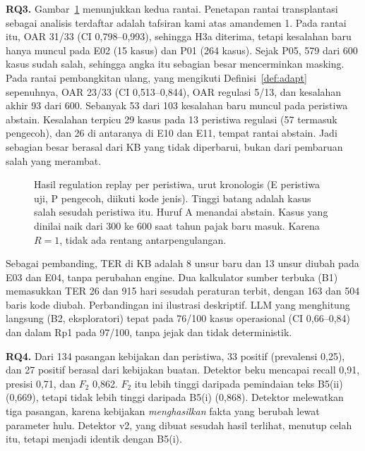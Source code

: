 \documentclass[conference]{IEEEtran}
\makeatletter
\DeclareRobustCommand{\en}[1]{{\usefont{\f@encoding}{\f@family}{\f@series}{it}#1\/}}
\makeatother
\begin{document}
\textbf{RQ3.} Gambar~\ref{fig:replay} menunjukkan kedua rantai. Penetapan rantai transplantasi sebagai analisis terdaftar adalah tafsiran kami atas amandemen 1. Pada rantai itu, OAR 31/33 (CI 0,798--0,993), sehingga H3a diterima, tetapi kesalahan baru hanya muncul pada E02 (15 kasus) dan P01 (264 kasus). Sejak P05, 579 dari 600 kasus sudah salah, sehingga angka itu sebagian besar mencerminkan \en{masking}. Pada rantai pembangkitan ulang, yang mengikuti Definisi~\ref{def:adapt} sepenuhnya, OAR 23/33 (CI 0,513--0,844), OAR regulasi 5/13, dan kesalahan akhir 93 dari 600. Sebanyak 53 dari 103 kesalahan baru muncul pada peristiwa \en{abstain}. Kesalahan terpicu 29 kasus pada 13 peristiwa regulasi (57 termasuk pengecoh), dan 26 di antaranya di E10 dan E11, tempat rantai \en{abstain}. Jadi sebagian besar berasal dari KB yang tidak diperbarui, bukan dari pembaruan salah yang merambat.

\begin{figure}[t]
\centering
\newcommand{\replaytinggi}{1.5cm}

\caption{Hasil \en{regulation replay} per peristiwa, urut kronologis (E peristiwa uji, P pengecoh, diikuti kode jenis). Tinggi batang adalah kasus salah sesudah peristiwa itu. Huruf A menandai \en{abstain}. Kasus yang dinilai naik dari 300 ke 600 saat tahun pajak baru masuk. Karena $R = 1$, tidak ada rentang antarpengulangan.}
\label{fig:replay}
\end{figure}

Sebagai pembanding, TER di KB adalah 8 unsur baru dan 13 unsur diubah pada E03 dan E04, tanpa perubahan \en{engine}. Dua kalkulator sumber terbuka (B1) memasukkan TER 26 dan 915 hari sesudah peraturan terbit, dengan 163 dan 504 baris kode diubah. Perbandingan ini ilustrasi deskriptif. LLM yang menghitung langsung (B2, eksploratori) tepat pada 76/100 kasus operasional (CI 0,66--0,84) dan dalam Rp1 pada 97/100, tanpa jejak dan tidak deterministik.

\textbf{RQ4.} Dari 134 pasangan kebijakan dan peristiwa, 33 positif (prevalensi 0,25), dan 27 positif berasal dari kebijakan buatan. Detektor beku mencapai \en{recall} 0,91, presisi 0,71, dan $F_2$ 0,862. $F_2$ itu lebih tinggi daripada pemindaian teks B5(ii) (0,669), tetapi tidak lebih tinggi daripada B5(i) (0,868). Detektor melewatkan tiga pasangan, karena kebijakan \emph{menghasilkan} fakta yang berubah lewat parameter hulu. Detektor v2, yang dibuat sesudah hasil terlihat, menutup celah itu, tetapi menjadi identik dengan B5(i).

\end{document}
